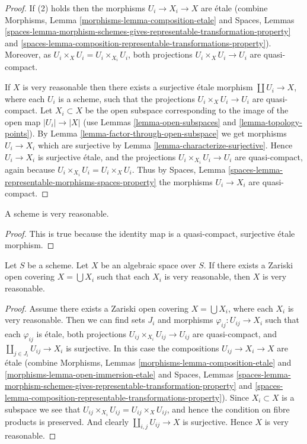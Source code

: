 \begin{proof}
If (2) holds then the morphisms $U_i \to X_i \to X$ are \'etale (combine
Morphisms, Lemma \ref{morphisms-lemma-composition-etale}
and
Spaces, Lemmas
\ref{spaces-lemma-morphism-schemes-gives-representable-transformation-property}
and
\ref{spaces-lemma-composition-representable-transformations-property}).
Moreover, as $U_i \times_X U_i = U_i \times_{X_i} U_i$,
both projections $U_i \times_X U_i \to U_i$ are quasi-compact.

\medskip\noindent
If $X$ is very reasonable then there exists a surjective \'etale morphism
$\coprod U_i \to X$, where each $U_i$ is a scheme, such that
the projections $U_i \times_X U_i \to U_i$ are quasi-compact.
Let $X_i \subset X$ be the open subspace corresponding to the image
of the open map $|U_i| \to |X|$ (use
Lemmas \ref{lemma-open-subspaces} and \ref{lemma-topology-points}).
By Lemma \ref{lemma-factor-through-open-subspace}
we get morphisms $U_i \to X_i$ which are
surjective by Lemma \ref{lemma-characterize-surjective}.
Hence $U_i \to X_i$ is surjective \'etale, and the projections
$U_i \times_{X_i} U_i \to U_i$ are quasi-compact, again because
$U_i \times_{X_i} U_i = U_i \times_X U_i$. Thus by
Spaces, Lemma \ref{spaces-lemma-representable-morphisms-spaces-property}
the morphisms $U_i \to X_i$ are quasi-compact.
\end{proof}

\begin{lemma}
\label{lemma-scheme-very-reasonable}
A scheme is very reasonable.
\end{lemma}

\begin{proof}
This is true because the identity map is a quasi-compact, surjective
\'etale morphism.
\end{proof}

\begin{lemma}
\label{lemma-very-reasonable-Zariski-local}
Let $S$ be a scheme.
Let $X$ be an algebraic space over $S$.
If there exists a Zariski open covering $X = \bigcup X_i$ such that
each $X_i$ is very reasonable, then $X$ is very reasonable.
\end{lemma}

\begin{proof}
Assume there exists a Zariski open covering
$X = \bigcup X_i$, where each $X_i$ is very reasonable.
Then we can find sets $J_i$ and morphisms
$\varphi_{ij} : U_{ij} \to X_i$ such that each $\varphi_{ij}$
is \'etale, both projections $U_{ij} \times_{X_i} U_{ij} \to U_{ij}$
are quasi-compact, and $\coprod_{j \in J_i} U_{ij} \to X_i$ is surjective.
In this case the compositions $U_{ij} \to X_i \to X$ are \'etale
(combine
Morphisms, Lemmas
\ref{morphisms-lemma-composition-etale}
and
\ref{morphisms-lemma-open-immersion-etale}
and
Spaces, Lemmas
\ref{spaces-lemma-morphism-schemes-gives-representable-transformation-property}
and
\ref{spaces-lemma-composition-representable-transformations-property}).
Since $X_i \subset X$ is a subspace we see that
$U_{ij} \times_{X_i} U_{ij} = U_{ij} \times_X U_{ij}$, and hence the
condition on fibre products is preserved. And clearly
$\coprod_{i, j} U_{ij} \to X$ is surjective. Hence $X$ is very reasonable.
\end{proof}

